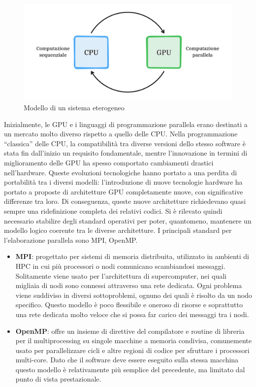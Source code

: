 \begin{figure}[ht]
    \centering
    \includegraphics[width=.9\linewidth]{images/chapter2/het_model2.png}
    \caption{Modello di un sistema eterogeneo}
    \label{fig:het_model}
\end{figure}


Inizialmente, le GPU e i linguaggi di programmazione parallela erano destinati a un mercato molto diverso rispetto a quello delle CPU. Nella programmazione ``classica'' delle CPU, la compatibilità tra diverse versioni dello stesso software è stata fin dall'inizio un requisito fondamentale, mentre l'innovazione in termini di miglioramento delle GPU ha spesso comportato cambiamenti drastici nell'hardware. Queste evoluzioni tecnologiche hanno portato a una perdita di portabilità tra i diversi modelli: l'introduzione di nuove tecnologie hardware ha portato a proposte di architetture GPU completamente nuove, con significative differenze tra loro. Di conseguenza, queste nuove architetture richiedevano quasi sempre una ridefinizione completa dei relativi codici. Si è rilevato quindi necessario stabilire degli standard operativi per poter, quantomeno, mantenere un modello logico coerente tra le diverse architetture.
I principali standard per l'elaborazione parallela sono MPI, OpenMP.

\begin{itemize}
    \item \textbf{MPI}: progettato per sistemi di memoria distribuita, utilizzato in ambienti di HPC in cui più processori o nodi comunicano scambiandosi messaggi. Solitamente viene usato per l'architettura di supercomputer, nei quali migliaia di nodi sono connessi attraverso una rete dedicata. Ogni problema viene suddiviso in diversi sottoproblemi, ognuno dei quali è risolto da un nodo specifico. Questo modello è poco flessibile e oneroso di risorse e soprattutto una rete dedicata molto veloce che si possa far carico dei messaggi tra i nodi.
    \item \textbf{OpenMP}: offre un insieme di direttive del compilatore e routine di libreria per il multiprocessing su singole macchine a memoria condivisa, comunemente usato per parallelizzare cicli e altre regioni di codice per sfruttare i processori multi-core. Dato che il software deve essere eseguito sulla stessa macchina questo modello è relativamente più semplice del precedente, ma limitato dal punto di vista prestazionale.
\end{itemize}

